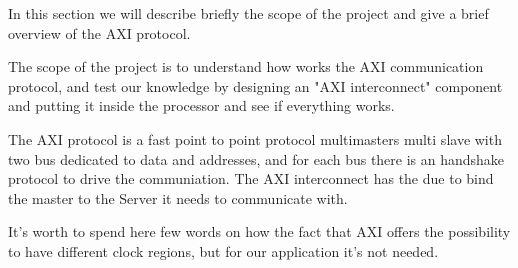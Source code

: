 In this section we will describe briefly the scope of the project and give a brief overview of the AXI protocol.

{}

The scope of the project is to understand how works the AXI communication protocol, and test our knowledge by designing an "AXI interconnect" component and putting it inside the processor and see if everything works.

{}

The AXI protocol is a fast point to point protocol multimasters multi slave with two bus dedicated to data and addresses, and for each bus there is an handshake protocol to drive the communiation. The AXI interconnect has the due to bind the master to the Server it needs to communicate with.

It's worth to spend here few words on how the fact that AXI offers the possibility to have different clock regions, but for our application it's not needed.
